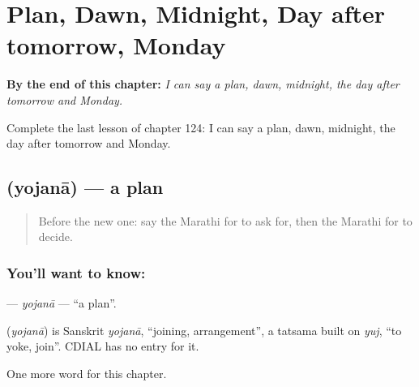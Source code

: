 
\chapter{Plan, Dawn, Midnight, Day after tomorrow, Monday}
\label{ch:mr-plan-dawn-midnight-day-after-tomorrow-monday}

\begin{chapteropening}
\textbf{By the end of this chapter:} \emph{I can say a plan, dawn, midnight, the day after tomorrow and Monday.}

Complete the last lesson of chapter 124: I can say a plan, dawn, midnight, the day after tomorrow and Monday.
\end{chapteropening}

\section[\texorpdfstring{\mr{योजना} (yojanā)}{योजना (yojanā)}]{ (yojanā) — a plan}

\label{lesson:MR-C124-yojana}



\begin{quote}
Before the new one: say the Marathi for to ask for, then the Marathi for to decide.
\end{quote}

\subsection*{You'll want to know: }
\textbf{} — \emph{yojanā} — \textquotedblleft{}a plan\textquotedblright{}.

\begin{cousinweb}
\textbf{} (\emph{yojanā}) is Sanskrit \emph{yojanā}, \textquotedblleft{}joining, arrangement\textquotedblright{}, a tatsama built on \emph{yuj}, \textquotedblleft{}to yoke, join\textquotedblright{}. CDIAL has no entry for it.
\end{cousinweb}

\begin{grammarlens}[title={What you've built}]
One more word for this chapter.
\end{grammarlens}

